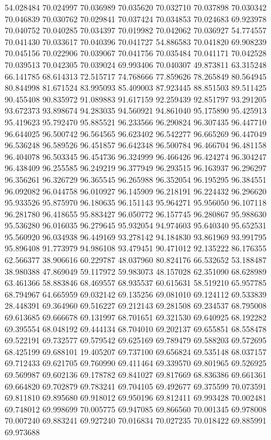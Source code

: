 54.028484
70.024997
70.036989
70.035620
70.032710
70.037898
70.030342
70.046839
70.030762
70.029841
70.037424
70.034853
70.024683
69.923978
70.040752
70.040285
70.034397
70.019982
70.042062
70.036927
54.774557
70.041430
70.033617
70.040396
70.041727
54.886583
70.041820
69.908239
70.045156
70.022906
70.039067
70.041756
70.035484
70.041171
70.042528
70.039513
70.042305
70.039024
69.993406
70.040307
49.873811
63.315248
66.141785
68.614313
72.515717
74.768666
77.859626
78.265849
80.564945
80.844998
81.671524
83.995093
85.409003
87.923445
88.851503
89.511425
90.455408
90.835972
91.089883
91.617159
92.259439
92.851797
93.291205
93.672373
93.898674
94.283035
94.560921
94.861040
95.175890
95.425913
95.419623
95.792470
95.885521
96.233566
96.290824
96.307435
96.447710
96.644025
96.500742
96.564565
96.623402
96.542277
96.665269
96.447049
96.536248
96.589526
96.451857
96.642348
96.500784
96.466704
96.481158
96.404078
96.503345
96.454736
96.324999
96.466426
96.424274
96.304247
96.438409
96.255585
96.249219
96.377949
96.293515
96.163937
96.296297
96.356261
96.326729
96.365545
96.265988
96.352054
96.195295
96.384551
96.092082
96.044758
96.010927
96.145909
96.218191
96.224432
96.296620
95.933526
95.875970
96.180635
96.151143
95.964271
95.956050
96.107118
96.281780
96.418655
95.883427
96.050772
96.157745
96.280867
95.988630
95.536280
96.016035
96.279645
95.932054
94.974603
95.640340
95.652531
95.560920
96.034938
96.449169
93.278142
94.184830
93.861969
93.991795
95.896408
91.773979
94.986108
93.479451
90.471012
92.135222
86.176355
62.566377
38.906616
60.229787
48.037960
80.824176
66.532652
53.188487
38.980388
47.869049
59.117972
59.983073
48.157028
62.351090
68.628989
63.461366
58.883846
68.469557
68.935537
60.615631
58.519210
65.957785
68.794967
64.665959
69.032142
69.135256
69.081010
69.124112
69.533839
28.448391
69.364960
69.516227
69.212143
69.281508
69.234537
68.795008
69.613685
69.666678
69.131997
68.701651
69.321530
69.640925
68.192282
69.395554
68.048192
69.444134
68.704010
69.202137
69.655851
68.558478
69.522191
69.732577
69.579542
69.625169
69.789479
69.588203
69.572695
68.425199
69.688101
19.405207
69.737100
69.656824
69.535148
68.037157
69.712433
69.621705
69.760990
69.411464
69.339570
69.801965
69.526925
69.569987
69.602136
69.178782
69.841027
69.817669
68.836386
69.661361
69.664820
69.702879
69.783241
69.704105
69.492677
69.375599
70.073591
69.811810
69.895680
69.918012
69.950196
69.812411
69.993428
70.002481
69.748012
69.998699
70.005775
69.947085
69.866560
70.001345
69.978008
70.007240
69.883241
69.927240
70.016834
70.027235
70.018422
69.885991
69.973688
